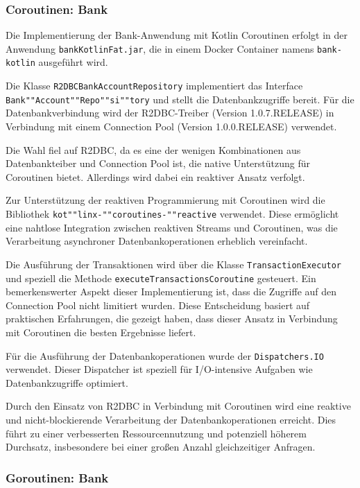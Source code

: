 \documentclass[fontsize=12pt,paper=a4,twoside=semi,parskip=half-,headsepline,headinclude]{scrreprt}
\begin{document}
\subsubsection{Coroutinen: Bank}

Die Implementierung der Bank-Anwendung mit Kotlin Coroutinen erfolgt in der Anwendung \texttt{bankKotlinFat.jar}, die in einem Docker Container namens \texttt{bank-kotlin} ausgeführt wird.

Die Klasse \texttt{R2DBCBankAccountRepository} implementiert das Interface \texttt{Bank""Account""Repo""si""tory} und stellt die Datenbankzugriffe bereit. Für die Datenbankverbindung wird der R2DBC-Treiber (Version 1.0.7.RELEASE) in Verbindung mit einem Connection Pool (Version 1.0.0.RELEASE) verwendet. 

Die Wahl fiel auf R2DBC, da es eine der wenigen Kombinationen aus Datenbankteiber und Connection Pool ist, die native Unterstützung für Coroutinen bietet. Allerdings wird dabei ein reaktiver Ansatz verfolgt.

Zur Unterstützung der reaktiven Programmierung mit Coroutinen wird die Bibliothek \texttt{kot""linx-""coroutines-""reactive} verwendet. Diese ermöglicht eine nahtlose Integration zwischen reaktiven Streams und Coroutinen, was die Verarbeitung asynchroner Datenbankoperationen erheblich vereinfacht.

Die Ausführung der Transaktionen wird über die Klasse \texttt{TransactionExecutor} und speziell die Methode \texttt{executeTransactionsCoroutine} gesteuert. Ein bemerkenswerter Aspekt dieser Implementierung ist, dass die Zugriffe auf den Connection Pool nicht limitiert wurden. Diese Entscheidung basiert auf praktischen Erfahrungen, die gezeigt haben, dass dieser Ansatz in Verbindung mit Coroutinen die besten Ergebnisse liefert.

Für die Ausführung der Datenbankoperationen wurde der \texttt{Dispatchers.IO} verwendet. Dieser Dispatcher ist speziell für I/O-intensive Aufgaben wie Datenbankzugriffe optimiert.

Durch den Einsatz von R2DBC in Verbindung mit Coroutinen wird eine reaktive und nicht-blockierende Verarbeitung der Datenbankoperationen erreicht. Dies führt zu einer verbesserten Ressourcennutzung und potenziell höherem Durchsatz, insbesondere bei einer großen Anzahl gleichzeitiger Anfragen.

\subsubsection{Goroutinen: Bank}
\end{document}
